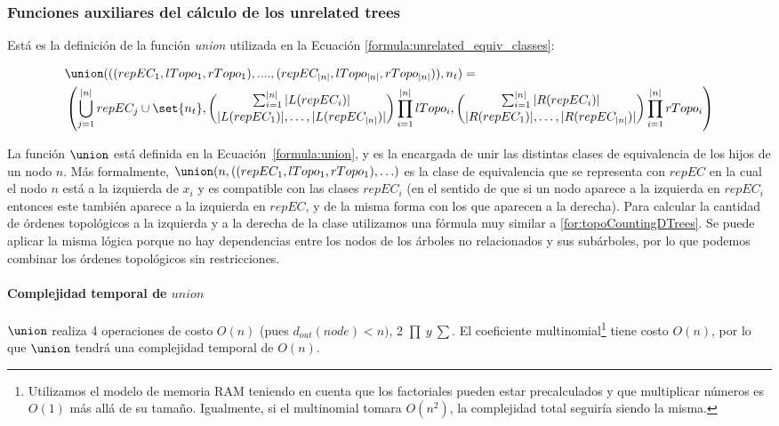 \subsubsection{Funciones auxiliares del cálculo de los unrelated trees} \label{subsubSection:auxiliaryFormulasUnrelatedTrees}

Está es la definición de la función \textit{union} utilizada en la Ecuación \ref{formula:unrelated_equiv_classes}:

\begin{align}\label{formula:union}
&\union(((repEC_1, lTopo_1, rTopo_1), ...., (repEC_{|n|}, lTopo_{|n|}, rTopo_{|n|})), n_t) = \nonumber \\ 
&\left(\bigcup_{j=1}^{|n|} repEC_j \cup \set{n_t}, \binom{\sum_{i=1}^{|n|} |L(repEC_i)|}{|L(repEC_1)|, \ldots, |L(repEC_{|n|})|} \prod_{i=1}^{|n|} lTopo_i,\binom{\sum_{i=1}^{|n|} |R(repEC_i)|}{|R(repEC_1)|, \ldots, |R(repEC_{|n|})|} \prod_{i=1}^{|n|} rTopo_i \right)
\end{align}

La función $\union$ está definida en la Ecuación~\ref{formula:union}, y es la encargada de unir las distintas clases de equivalencia de los hijos de un nodo $n$. Más formalmente, $\union(n, ((repEC_1, lTopo_1, rTopo_1), \ldots)$ es la clase de equivalencia que se representa con $repEC$ en la cual el nodo $n$ está a la izquierda de $x_i$ y es compatible con las clases $repEC_i$ (en el sentido de que si un nodo aparece a la izquierda en $repEC_i$ entonces este también aparece a la izquierda en $repEC$, y de la misma forma con los que aparecen a la derecha). Para calcular la cantidad de órdenes topológicos a la izquierda y a la derecha de la clase utilizamos una fórmula muy similar a \ref{for:topoCountingDTrees}. Se puede aplicar la misma lógica porque no hay dependencias entre los nodos de los árboles no relacionados y sus subárboles, por lo que podemos combinar los órdenes topológicos sin restricciones.

\paragraph{Complejidad temporal de $union$}

$\union$ realiza 4 operaciones de costo $O(n)$ (pues $d_{out}(node)<n)$, 2 $\prod \ y \ \sum$. El coeficiente multinomial\footnote{Utilizamos el modelo de 
memoria RAM teniendo en cuenta que los factoriales pueden estar precalculados y que multiplicar números es $O(1)$ más allá de su tamaño. Igualmente, si el multinomial tomara $O(n^2)$, la complejidad total seguiría siendo la misma.} tiene costo $O(n)$, por lo que $\union$ tendrá una complejidad temporal de $O(n)$.



